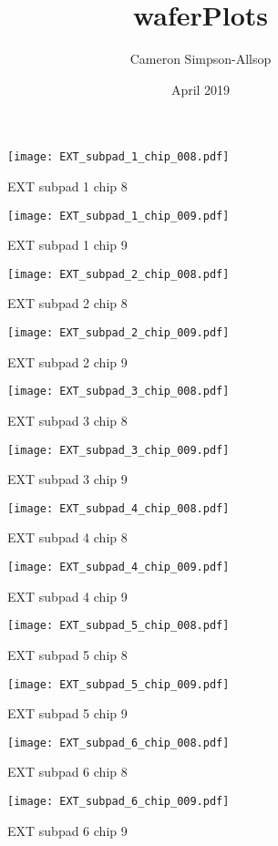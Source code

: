 \documentclass[a4paper,11pt]{article}
\title{waferPlots}
\author{Cameron Simpson-Allsop}
\date{April 2019}
\begin{document}
\begin{figure}[htbp] \centering\texttt{[image: EXT\_subpad\_1\_chip\_008.pdf]}\caption{EXT subpad 1 chip 8} \end{figure} 
\begin{figure}[htbp] \centering\texttt{[image: EXT\_subpad\_1\_chip\_009.pdf]}\caption{EXT subpad 1 chip 9} \end{figure} 
\begin{figure}[htbp] \centering\texttt{[image: EXT\_subpad\_2\_chip\_008.pdf]}\caption{EXT subpad 2 chip 8} \end{figure} 
\begin{figure}[htbp] \centering\texttt{[image: EXT\_subpad\_2\_chip\_009.pdf]}\caption{EXT subpad 2 chip 9} \end{figure} 
\begin{figure}[htbp] \centering\texttt{[image: EXT\_subpad\_3\_chip\_008.pdf]}\caption{EXT subpad 3 chip 8} \end{figure} 
\begin{figure}[htbp] \centering\texttt{[image: EXT\_subpad\_3\_chip\_009.pdf]}\caption{EXT subpad 3 chip 9} \end{figure} 
\begin{figure}[htbp] \centering\texttt{[image: EXT\_subpad\_4\_chip\_008.pdf]}\caption{EXT subpad 4 chip 8} \end{figure} 
\begin{figure}[htbp] \centering\texttt{[image: EXT\_subpad\_4\_chip\_009.pdf]}\caption{EXT subpad 4 chip 9} \end{figure} 
\begin{figure}[htbp] \centering\texttt{[image: EXT\_subpad\_5\_chip\_008.pdf]}\caption{EXT subpad 5 chip 8} \end{figure} 
\begin{figure}[htbp] \centering\texttt{[image: EXT\_subpad\_5\_chip\_009.pdf]}\caption{EXT subpad 5 chip 9} \end{figure} 
\begin{figure}[htbp] \centering\texttt{[image: EXT\_subpad\_6\_chip\_008.pdf]}\caption{EXT subpad 6 chip 8} \end{figure} 
\begin{figure}[htbp] \centering\texttt{[image: EXT\_subpad\_6\_chip\_009.pdf]}\caption{EXT subpad 6 chip 9} \end{figure} 
\end{document}
